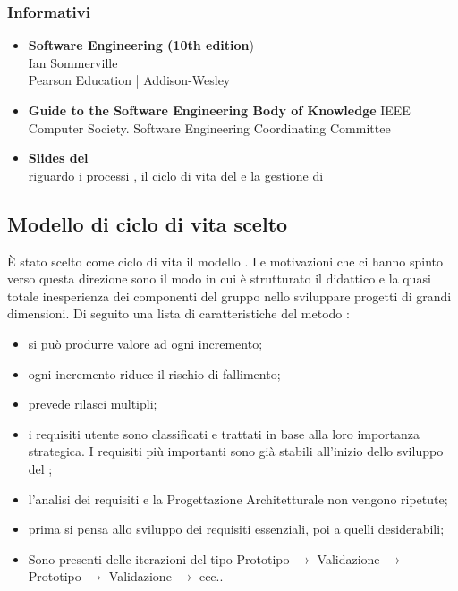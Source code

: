 		\subsubsection{Informativi}
			\begin{itemize}
				\item \textbf{Software Engineering (10th edition}) \\
				Ian Sommerville \\
				Pearson Education | Addison-Wesley
				\item \textbf{Guide to the Software Engineering Body of Knowledge}
				IEEE Computer Society. Software Engineering Coordinating Committee
				\item \textbf{Slides del \COMMITTENTE} \\ riguardo i  \href{http://www.math.unipd.it/~tullio/IS-1/2015/Dispense/L02.pdf}{processi }, il \href{http://www.math.unipd.it/~tullio/IS-1/2015/Dispense/L03.pdf}{ciclo di vita del } e \href{http://www.math.unipd.it/~tullio/IS-1/2015/Dispense/L04.pdf}{la gestione di }	
			\end{itemize}
	\subsection{Modello di ciclo di vita scelto}
	È stato scelto come ciclo di vita il modello . Le motivazioni che ci hanno spinto verso questa direzione sono il modo in cui è strutturato il  didattico e la quasi totale inesperienza dei componenti del gruppo nello sviluppare progetti  di grandi dimensioni. Di seguito una lista di caratteristiche del metodo :
	\begin{itemize}
		\item si può produrre valore ad ogni incremento;
		\item ogni incremento riduce il rischio di fallimento;
		\item prevede rilasci multipli;
		\item i requisiti utente sono classificati e trattati in base alla loro importanza strategica. I requisiti più importanti sono già stabili all'inizio dello sviluppo del ;
		\item l'analisi dei requisiti e la Progettazione Architetturale non vengono ripetute;
		\item prima si pensa allo sviluppo dei requisiti essenziali, poi a quelli desiderabili;
		\item Sono presenti delle iterazioni del tipo Prototipo $\rightarrow$ Validazione $\rightarrow$ Prototipo $\rightarrow$ Validazione $\rightarrow$ ecc..
	\end{itemize}
